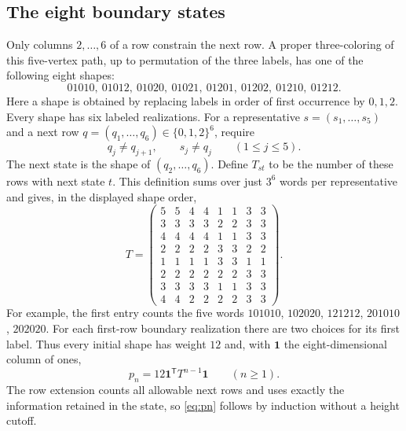 \documentclass[11pt]{article}
\newcommand{\one}{\mathbf{1}}
\begin{document}
\subsection{The eight boundary states}
Only columns $2,\ldots,6$ of a row constrain the next row.
A proper three-coloring of this five-vertex path, up to permutation of the
three labels, has one of the following eight shapes:
\[
01010,\ 01012,\ 01020,\ 01021,\ 01201,\ 01202,\ 01210,\ 01212.
\]
Here a shape is obtained by replacing labels in order of first occurrence
by $0,1,2$. Every shape has six labeled realizations.
For a representative $s=(s_1,\ldots,s_5)$ and a next row
$q=(q_1,\ldots,q_6)\in\{0,1,2\}^6$, require
\[
q_j\ne q_{j+1},\qquad s_j\ne q_j\qquad(1\le j\le5).
\]
The next state is the shape of $(q_2,\ldots,q_6)$.
Define $T_{st}$ to be the number of these rows with next state $t$.
This definition sums over just $3^6$ words per representative and gives,
in the displayed shape order,
\begin{equation}\label{eq:matrix}
T=\begin{pmatrix}
5&5&4&4&1&1&3&3\\
3&3&3&3&2&2&3&3\\
4&4&4&4&1&1&3&3\\
2&2&2&2&3&3&2&2\\
1&1&1&1&3&3&1&1\\
2&2&2&2&2&2&3&3\\
3&3&3&3&1&1&3&3\\
4&4&2&2&2&2&3&3
\end{pmatrix}.
\end{equation}
For example, the first entry counts the five words
$101010$, $102020$, $121212$, $201010$, $202020$.
For each first-row boundary realization there are two choices for its first
label. Thus every initial shape has weight $12$ and, with $\one$ the
eight-dimensional column of ones,
\begin{equation}\label{eq:pn}
p_n=12\one^{\mathsf T}T^{n-1}\one\qquad(n\ge1).
\end{equation}
The row extension counts all allowable next rows and uses exactly the
information retained in the state, so \eqref{eq:pn} follows by induction
without a height cutoff.
\end{document}
